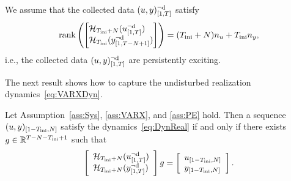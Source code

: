 \begin{assum} \label{ass:PE}
	We assume that the collected data $(u,y)_{[1,T]}^{\neg\mathrm{d}}$ satisfy
	\[
		\rank\left( \begin{bmatrix*}[l]
			\Hankel_{\tini+N}(\traud{u}{1}{T}) \\ \Hankel_{\tini}(\traud{y}{1}{T-N+1})
		\end{bmatrix*}\right) = (\tini+N)n_u + \tini n_y,
	\]
	i.e., the collected data $(u,y)_{[1,T]}^{\neg\mathrm{d}}$ are persistently exciting.
\end{assum}
The next result shows how to capture the undisturbed realization dynamics~\eqref{eq:VARXDyn}.
\begin{lem} \label{lem:Prediction}
	 Let Assumption~\ref{ass:Sys}, \ref{ass:VARX}, and \ref{ass:PE} hold. Then a sequence $(u,y)_{[1-T_\text{ini},N]}$ satisfy the dynamics~\eqref{eq:DynReal} if and only if there exists $g\in\mathbb{R}^{T-N-T_\text{ini}+1}$ such that
\begin{equation} \label{eq:FundaLemma}
	\left[\begin{array}{ll} \mathcal{H}_{T_\text{ini}+N}(u_{[1,T]}^{\neg\mathrm{d}})\\ \mathcal{H}_{T_\text{ini}+N}(y_{[1,T]}^{\neg\mathrm{d}}) \end{array}\right] g = 
	\left[\begin{array}{ll} u_{[1-T_\text{ini},N]} \\ y_{[1-T_\text{ini},N]} \end{array}\right].
\end{equation}
\end{lem}
